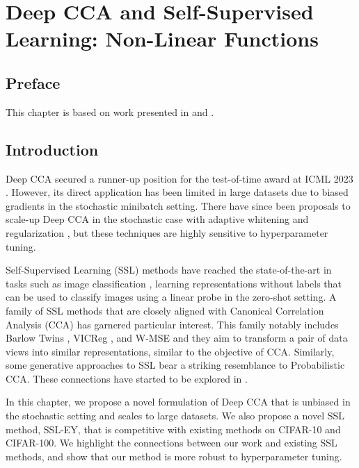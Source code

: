 \graphicspath{{chapters/deep_learning/}}

\chapter{Deep CCA and Self-Supervised Learning: Non-Linear Functions}\label{ch:deep_learning}
\minitoc
\section*{Preface}

This chapter is based on work presented in \citet{chapman2023cca} and \citet{chapman2023efficient}.

\section{Introduction}

Deep CCA \citep{andrew2013deep} secured a runner-up position for the test-of-time award at ICML 2023 \citep{ICML2023TOT}.
However, its direct application has been limited in large datasets due to biased gradients in the stochastic minibatch setting.
There have since been proposals to scale-up Deep CCA in the stochastic case with adaptive whitening \citep{wang2015stochastic} and regularization \citep{chang2018scalable}, but these techniques are highly sensitive to hyperparameter tuning.

Self-Supervised Learning (SSL) methods have reached the state-of-the-art in tasks such as image classification \citep{balestriero2023cookbook}, learning representations without labels that can be used to classify images using a linear probe in the zero-shot setting.
A family of SSL methods that are closely aligned with Canonical Correlation Analysis (CCA) has garnered particular interest.
This family notably includes Barlow Twins \citep{zbontar2021barlow}, VICReg \citep{bardes2021vicreg}, and W-MSE \citep{ermolov2021whitening} and they aim to transform a pair of data views into similar representations, similar to the objective of CCA. Similarly, some generative approaches to SSL\citep{sansone2022gedi} bear a striking resemblance to Probabilistic CCA\citep{bach2005probabilistic}.
These connections have started to be explored in \citet{balestriero2022contrastive}.

In this chapter, we propose a novel formulation of Deep CCA that is unbiased in the stochastic setting and scales to large datasets.
We also propose a novel SSL method, SSL-EY, that is competitive with existing methods on CIFAR-10 and CIFAR-100.
We highlight the connections between our work and existing SSL methods, and show that our method is more robust to hyperparameter tuning.

